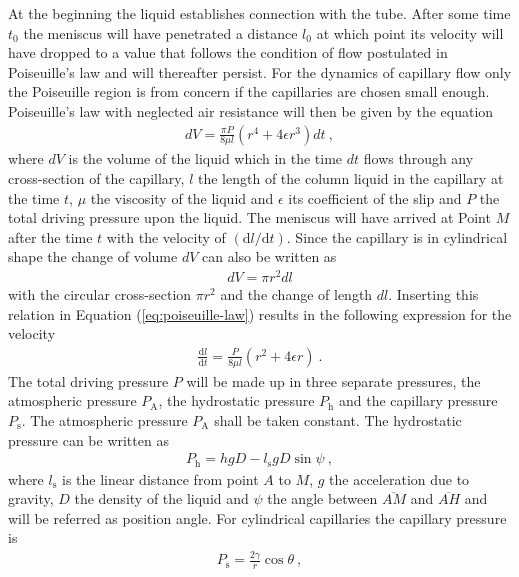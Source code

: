 \documentclass[aip, amsmath, amssymb, reprint, twocolumn, floatfix]{revtex4-1}
\newcommand{\dldt}{\frac{\mathrm{d}l}{\mathrm{d}t}}
\newcommand{\Pa}{P_\mathrm{A}}
\newcommand{\Pt}{P}
\newcommand{\Ps}{P_\mathrm{s}}
\newcommand{\Ph}{P_\mathrm{h}}
\newcommand{\ls}{l_\mathrm{s}}
\begin{document}
At the beginning the liquid establishes connection with the tube. After some time $t_0$ the meniscus will have penetrated a distance $l_0$ at which point its velocity will have dropped to a value that follows the condition of flow postulated in Poiseuille's law and will thereafter persist. For the dynamics of capillary flow only the Poiseuille region is from concern if the capillaries are chosen small enough. Poiseuille's law with neglected air resistance will then be given by the equation 
\begin{gather}
	dV = \frac{\pi \Pt}{8\mu l}\left(r^4 + 4\epsilon r^3 \right) dt~,
	\label{eq:poiseuille-law}
\end{gather}
where $dV$ is the volume of the liquid which in the time $dt$ flows through any cross-section of the capillary, $l$ the length of the column liquid in the capillary at the time $t$, $\mu$ the viscosity of the liquid and $\epsilon$ its coefficient of the slip and $\Pt$ the total driving pressure upon the liquid. The meniscus will have arrived at Point $M$ after the time $t$ with the velocity of $\left(\mathrm{d}l/\mathrm{d}t\right)$. Since the capillary is in cylindrical shape the change of volume $dV$ can also be written as
\begin{gather}
	dV = \pi r^2 dl
	\label{eq:change-cylinder}
\end{gather}
with the circular cross-section $\pi r^2$ and the change of length $dl$. Inserting this relation in Equation (\ref{eq:poiseuille-law}) results in the following expression for the velocity
\begin{gather}
	\dldt = \frac{\Pt}{8\mu l}\left(r^2 + 4\epsilon r \right)~.
	\label{eq:poiseuille-velocity}
\end{gather}
The total driving pressure $\Pt$ will be made up in three separate pressures, the atmospheric pressure $\Pa$, the hydrostatic pressure $\Ph$ and the capillary pressure $\Ps$. The atmospheric pressure $\Pa$ shall be taken constant. The hydrostatic pressure can be written as
\begin{gather}
	\Ph = hgD - \ls g D \sin \psi~,
	\label{eq:hydrostatic-pressure}
\end{gather}
where $\ls$ is the linear distance from point $A$ to $M$, $g$ the acceleration due to gravity, $D$ the density of the liquid and $\psi$ the angle between $\overline{AM}$ and $\overline{AH}$ and will be referred as position angle. For cylindrical capillaries the capillary pressure is 
\begin{gather}
	\Ps = \frac{2\gamma}{r}\cos \theta~,
	\label{eq:capillary-pressure}
\end{gather}
\end{document}
